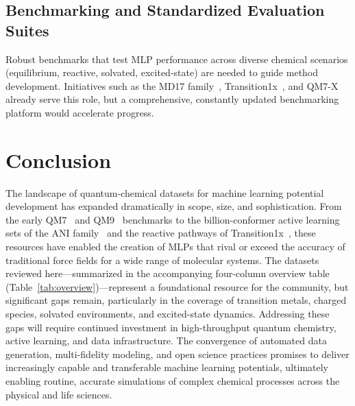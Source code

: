 \documentclass[12pt]{article}
\begin{document}
\subsection*{Benchmarking and Standardized Evaluation Suites}
Robust benchmarks that test MLP performance across diverse chemical scenarios (equilibrium, reactive, solvated, excited-state) are needed to guide method development. Initiatives such as the MD17 family~\cite{ds20-18}, Transition1x~\cite{ds28-47}, and QM7-X~\cite{ds6-33} already serve this role, but a comprehensive, constantly updated benchmarking platform would accelerate progress.

\section{Conclusion}

The landscape of quantum-chemical datasets for machine learning potential development has expanded dramatically in scope, size, and sophistication. From the early QM7~\cite{ds7-32} and QM9~\cite{ds1-1} benchmarks to the billion-conformer active learning sets of the ANI family~\cite{ds25-7,ds26-3,ds27-8} and the reactive pathways of Transition1x~\cite{ds28-47}, these resources have enabled the creation of MLPs that rival or exceed the accuracy of traditional force fields for a wide range of molecular systems. The datasets reviewed here—summarized in the accompanying four-column overview table (Table~\ref{tab:overview})—represent a foundational resource for the community, but significant gaps remain, particularly in the coverage of transition metals, charged species, solvated environments, and excited-state dynamics. Addressing these gaps will require continued investment in high-throughput quantum chemistry, active learning, and data infrastructure. The convergence of automated data generation, multi-fidelity modeling, and open science practices promises to deliver increasingly capable and transferable machine learning potentials, ultimately enabling routine, accurate simulations of complex chemical processes across the physical and life sciences.
\end{document}
